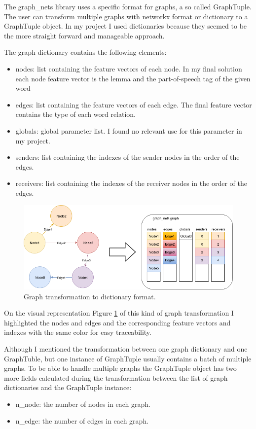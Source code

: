 The graph\_nets library uses a specific format for graphs, a so called GraphTuple. The user can transform multiple graphs with networkx format or dictionary	 to a GraphTuple object. In my project I used dictionaries because they seemed to be the more straight forward and manageable approach.

The graph dictionary contains the following elements:
\begin{itemize}
	\item nodes: list containing the feature vectors of each node. In my final solution each node feature vector is the lemma and the part-of-speech tag of the given word 
	\item edges: list containing the feature vectors of each edge. The final feature vector contains the type of each word relation.
	\item globals: global parameter list. I found no relevant use for this parameter in my project.
	\item senders: list containing the indexes of the sender nodes in the order of the edges.
	\item receivers: list containing the indexes of the receiver nodes in the order of the edges.
\end{itemize}

\begin{figure}[!ht]
	\centering
	\includegraphics[width=150mm, keepaspectratio]{figures/transform_color.png}
	\caption{Graph transformation to dictionary format.}
	\label{fig:transform_graph}
\end{figure}

On the visual representation Figure \ref{fig:transform_graph} of this kind of graph transformation I highlighted the nodes and edges and the corresponding feature vectors and indexes with the same color for easy traceability.

Although I mentioned the transformation between one graph dictionary and one GraphTuble, but one instance of GraphTuple usually contains a batch of multiple graphs. To be able to handle multiple graphs the GraphTuple object has two more fields calculated during the transformation between the list of graph dictionaries and the GraphTuple instance:
\begin{itemize}
	\item n\_node: the number of nodes in each graph.
	\item n\_edge: the number of edges in each graph.
\end{itemize}

